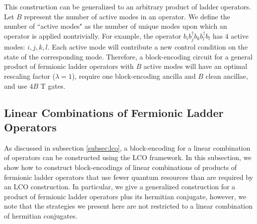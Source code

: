 This construction can be generalized to an arbitrary product of ladder operators.
Let $B$ represent the number of active modes in an operator.
We define the number of ``active modes" as the number of unique modes upon which an operator is applied nontrivially.
For example, the operator $b_i b_j^\dagger b_k b_l^\dagger b_l$ has $4$ active modes: $i, j, k, l$.
Each active mode will contribute a new control condition on the state of the corresponding mode.
Therefore, a block-encoding circuit for a general product of fermionic ladder operators with $B$ active modes will have an optimal rescaling factor ($\lambda = 1$), require one block-encoding ancilla and $B$ clean ancillae, and use $4B$ T gates.


\subsection{Linear Combinations of Fermionic Ladder Operators}

As discussed in subsection \ref{subsec:lco}, a block-encoding for a linear combination of operators can be constructed using the LCO framework.
In this subsection, we show how to construct block-encodings of linear combinations of products of fermionic ladder operators that use fewer quantum resources than are required by an LCO construction.
In particular, we give a generalized construction for a product of fermionic ladder operators plus its hermitian conjugate, however, we note that the strategies we present here are not restricted to a linear combination of hermitian conjugates.



